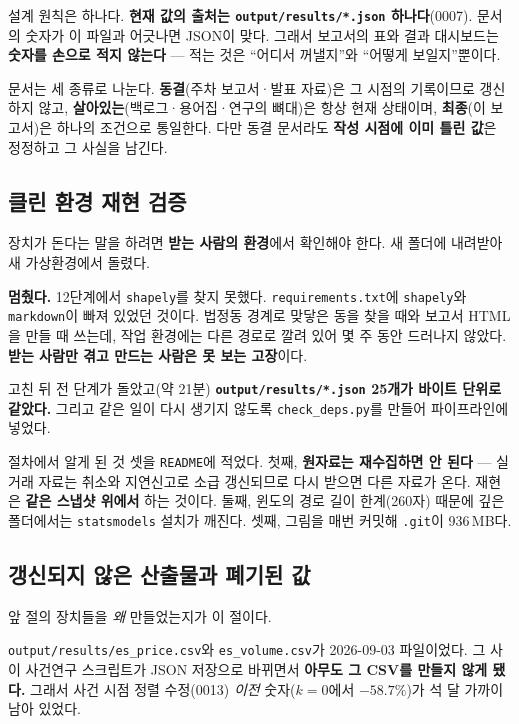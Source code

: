 설계 원칙은 하나다. \textbf{현재 값의 출처는 \texttt{output/results/*.json}
하나다}(0007). 문서의 숫자가 이 파일과 어긋나면 JSON이 맞다. 그래서 보고서의
표와 결과 대시보드는 \textbf{숫자를 손으로 적지 않는다} --- 적는 것은 ``어디서
꺼낼지''와 ``어떻게 보일지''뿐이다.

문서는 세 종류로 나눈다. \textbf{동결}(주차 보고서·발표 자료)은 그 시점의
기록이므로 갱신하지 않고, \textbf{살아있는}(백로그·용어집·연구의 뼈대)은 항상
현재 상태이며, \textbf{최종}(이 보고서)은 하나의 조건으로 통일한다. 다만 동결
문서라도 \textbf{작성 시점에 이미 틀린 값}은 정정하고 그 사실을 남긴다.

\subsection{클린 환경 재현 검증}

장치가 돈다는 말을 하려면 \textbf{받는 사람의 환경}에서 확인해야 한다. 새 폴더에
내려받아 새 가상환경에서 돌렸다.

\textbf{멈췄다.} 12단계에서 \texttt{shapely}를 찾지 못했다.
\texttt{requirements.txt}에 \texttt{shapely}와 \texttt{markdown}이 빠져
있었던 것이다. 법정동 경계로 맞닿은 동을 찾을 때와 보고서 HTML을 만들 때 쓰는데,
작업 환경에는 다른 경로로 깔려 있어 몇 주 동안 드러나지 않았다.
\textbf{받는 사람만 겪고 만드는 사람은 못 보는 고장}이다.

고친 뒤 전 단계가 돌았고(약 21분) \textbf{\texttt{output/results/*.json} 25개가
바이트 단위로 같았다.} 그리고 같은 일이 다시 생기지 않도록 \texttt{check\_deps.py}를
만들어 파이프라인에 넣었다.

절차에서 알게 된 것 셋을 \texttt{README}에 적었다. 첫째, \textbf{원자료는
재수집하면 안 된다} --- 실거래 자료는 취소와 지연신고로 소급 갱신되므로 다시
받으면 다른 자료가 온다. 재현은 \textbf{같은 스냅샷 위에서} 하는 것이다. 둘째,
윈도의 경로 길이 한계(260자) 때문에 깊은 폴더에서는 \texttt{statsmodels} 설치가
깨진다. 셋째, 그림을 매번 커밋해 \texttt{.git}이 936\,MB다.

\subsection{갱신되지 않은 산출물과 폐기된 값}

앞 절의 장치들을 \emph{왜} 만들었는지가 이 절이다.

\texttt{output/results/es\_price.csv}와 \texttt{es\_volume.csv}가 2026-09-03
파일이었다. 그 사이 사건연구 스크립트가 JSON 저장으로 바뀌면서
\textbf{아무도 그 CSV를 만들지 않게 됐다.} 그래서 사건 시점 정렬 수정(0013)
\emph{이전} 숫자($k=0$에서 $-58.7\%$)가 석 달 가까이 남아 있었다.

